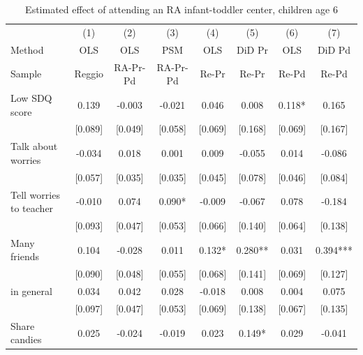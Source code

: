 \documentclass[12pt]{article}
\begin{document}
\begin{table}[ht]
\caption{Estimated effect of attending an RA infant-toddler center, children age 6}

\label{tab:childIT}
\begin{center}
\begin{adjustbox}{width=1.2\textwidth,center=\textwidth}
\small
\begin{tabular}{lccccccc}
\hline 
 & {(1) } & {(2) } & {(3) } & {(4) } & {(5) } & {(6) } & {(7) }\\
{Method } & {OLS } & {OLS } & {PSM } & {OLS } & {DiD Pr } & {OLS } & {DiD Pd }\\
{Sample } & {Reggio } & {RA-Pr-Pd } & {RA-Pr-Pd } & {Re-Pr } & {Re-Pr } & {Re-Pd } & {Re-Pd }\\
\hline 
{Low SDQ score } & {0.139 } & {-0.003 } & {-0.021 } & {0.046 } & {0.008 } & {0.118{*} } & {0.165 }\\
 & [0.089] & [0.049] & [0.058] & [0.069] & [0.168] & [0.069] & [0.167]\\
{Talk about worries } & {-0.034 } & {0.018 } & {0.001 } & {0.009 } & {-0.055 } & {0.014 } & {-0.086 }\\
 & [0.057] & [0.035] & [0.035] & [0.045] & [0.078] & [0.046] & [0.084]\\
{Tell worries to teacher } & {-0.010 } & {0.074 } & {0.090{*} } & {-0.009 } & {-0.067 } & {0.078 } & {-0.184 }\\
 & [0.093] & [0.047] & [0.053] & [0.066] & [0.140] & [0.064] & [0.138]\\
{Many friends } & {0.104 } & {-0.028 } & {0.011 } & {0.132{*} } & {0.280{*}{*} } & {0.031 } & {0.394{*}{*}{*} }\\
 & [0.090] & [0.048] & [0.055] & [0.068] & [0.141] & [0.069] & [0.127]\\
{%
in general } & {0.034 } & {0.042 } & {0.028 } & {-0.018 } & {0.008 } & {0.004 } & {0.075 }\\
 & [0.097] & [0.047] & [0.053] & [0.069] & [0.138] & [0.067] & [0.135]\\
{Share candies } & {0.025 } & {-0.024 } & {-0.019 } & {0.023 } & {0.149{*} } & {0.029 } & {-0.041 }\\

\end{tabular}
\end{adjustbox}
\end{center}
\end{table}
\end{document}
